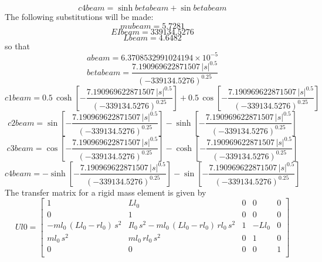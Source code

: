 \documentclass[12pt]{article}
\begin{document}
\begin{equation}
 c4beam=\sinh betabeam+\sin betabeam 
\end{equation}
The following substitutions will be made:
\begin{equation}
	mubeam=5.7281
\end{equation}
\begin{equation}
	EIbeam=339134.5276
\end{equation}
\begin{equation}
	Lbeam=4.6482
\end{equation}
so that
\begin{equation}
abeam= 6.3708532991024194 \times 10^{-5} 
\end{equation}
\begin{equation}
betabeam=  \displaystyle \frac{7.190969622871507\,\left| s\right| ^0.5}{\left(-339134.5276 \right)^0.25} 
\end{equation}
\begin{equation}
c1beam= 0.5\,\cosh \left[- \displaystyle \frac{7.190969622871507\,\left| s\right| ^0.5}{ \left(-339134.5276\right)^0.25}\right]+0.5\,\cos \left[- \displaystyle \frac{ 7.190969622871507\,\left| s\right| ^0.5}{\left(-339134.5276 \right)^0.25}\right] 
\end{equation}
\begin{equation}
c2beam= \sin \left[- \displaystyle \frac{7.190969622871507\,\left| s\right| ^0.5}{\left(- 339134.5276\right)^0.25}\right]-\sinh \left[- \displaystyle \frac{7.190969622871507\, \left| s\right| ^0.5}{\left(-339134.5276\right)^0.25}\right] 
\end{equation}
\begin{equation}
c3beam= \cos \left[- \displaystyle \frac{7.190969622871507\,\left| s\right| ^0.5}{\left(- 339134.5276\right)^0.25}\right]-\cosh \left[- \displaystyle \frac{7.190969622871507\, \left| s\right| ^0.5}{\left(-339134.5276\right)^0.25}\right] 
\end{equation}
\begin{equation}
c4beam= -\sinh \left[- \displaystyle \frac{7.190969622871507\,\left| s\right| ^0.5}{ \left(-339134.5276\right)^0.25}\right]-\sin \left[- \displaystyle \frac{ 7.190969622871507\,\left| s\right| ^0.5}{\left(-339134.5276 \right)^0.25}\right] 
\end{equation}
The transfer matrix for a rigid mass element is given by
\begin{equation}
Ul0= \left[ \begin{array}{ccccc}1&Ll_0&0&0&0\\ 0&1&0&0&0\\ -ml_0\,\left(Ll_0-rl_0\right) \,s^2&Il_0\,s^2-ml_0\,\left(Ll_0-rl_0\right)\,rl_0\,s^2&1&-Ll_0&0 \\ ml_0\,s^2&ml_0\,rl_0\,s^2&0&1&0\\ 0&0&0&0&1\\ \end{array} \right] 
\end{equation}
\end{document}
